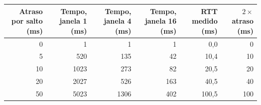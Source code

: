 \begin{tabular}{rrrrrr}
\toprule
Atraso por salto (ms) & Tempo, janela 1 (ms) & Tempo, janela 4 (ms) & Tempo, janela 16 (ms) & RTT medido (ms) & $2\times$ atraso (ms) \\
\midrule
0 & 1 & 1 & 1 & 0,0 & 0 \\
5 & 520 & 135 & 42 & 10,4 & 10 \\
10 & 1023 & 273 & 82 & 20,5 & 20 \\
20 & 2027 & 526 & 163 & 40,5 & 40 \\
50 & 5023 & 1306 & 402 & 100,5 & 100 \\
\bottomrule
\end{tabular}
